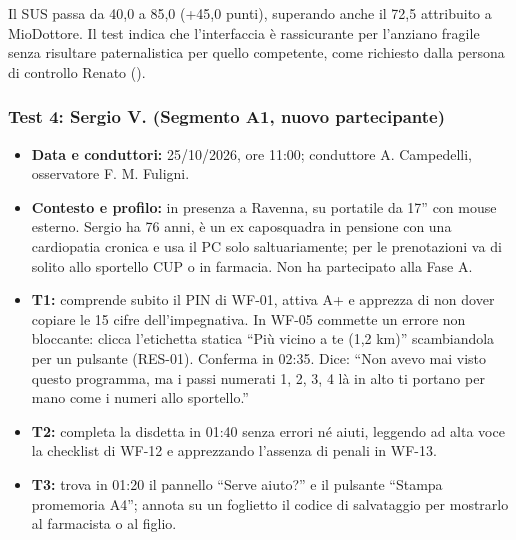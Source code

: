 Il SUS passa da 40,0 a 85,0 (+45,0 punti), superando anche il 72,5 attribuito a MioDottore. Il test indica che l'interfaccia è rassicurante per l'anziano fragile senza risultare paternalistica per quello competente, come richiesto dalla persona di controllo Renato ().

\subsubsection{Test 4: Sergio V. (Segmento A1, nuovo partecipante)}

\begin{itemize}
\item \textbf{Data e conduttori:} 25/10/2026, ore 11:00; conduttore A. Campedelli, osservatore F. M. Fuligni.
\item \textbf{Contesto e profilo:} in presenza a Ravenna, su portatile da 17'' con mouse esterno. Sergio ha 76 anni, è un ex caposquadra in pensione con una cardiopatia cronica e usa il PC solo saltuariamente; per le prenotazioni va di solito allo sportello CUP o in farmacia. Non ha partecipato alla Fase A.
\end{itemize}


\begin{itemize}
\item \textbf{T1:} comprende subito il PIN di WF-01, attiva A+ e apprezza di non dover copiare le 15 cifre dell'impegnativa. In WF-05 commette un errore non bloccante: clicca l'etichetta statica ``Più vicino a te (1,2 km)'' scambiandola per un pulsante (RES-01). Conferma in 02:35. Dice: \enquote{Non avevo mai visto questo programma, ma i passi numerati 1, 2, 3, 4 là in alto ti portano per mano come i numeri allo sportello.}
\item \textbf{T2:} completa la disdetta in 01:40 senza errori né aiuti, leggendo ad alta voce la checklist di WF-12 e apprezzando l'assenza di penali in WF-13.
\item \textbf{T3:} trova in 01:20 il pannello ``Serve aiuto?'' e il pulsante ``Stampa promemoria A4''; annota su un foglietto il codice di salvataggio per mostrarlo al farmacista o al figlio.
\end{itemize}

